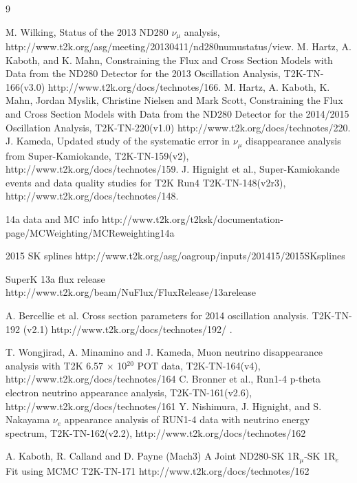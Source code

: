 \begin{thebibliography}{9}
%
%

  M. Wilking,
  Status of the 2013 ND280 $\nu_{\mu}$ analysis,\\
  http://www.t2k.org/asg/meeting/20130411/nd280numustatus/view.
  M. Hartz, A. Kaboth, and K. Mahn,
  Constraining the Flux and Cross Section Models with Data from the
  ND280 Detector for the 2013 Oscillation Analysis,
  T2K-TN-166(v3.0)
  http://www.t2k.org/docs/technotes/166.
  M. Hartz, A. Kaboth, K. Mahn, Jordan Myslik, Christine Nielsen and Mark Scott,
  Constraining the Flux and Cross Section Models with Data from the
  ND280 Detector for the 2014/2015 Oscillation Analysis,
  T2K-TN-220(v1.0)
  http://www.t2k.org/docs/technotes/220.
   J. Kameda,
   Updated study of the systematic error in $\nu_{\mu}$ disappearance analysis from Super-Kamiokande,
   T2K-TN-159(v2),
   http://www.t2k.org/docs/technotes/159.
   J. Hignight et al.,
   Super-Kamiokande events and data quality studies for T2K Run4
   T2K-TN-148(v2r3),
   http://www.t2k.org/docs/technotes/148.

%
%

   14a data and MC info
   http://www.t2k.org/t2ksk/documentation-page/MCWeighting/MCReweighting14a

   2015 SK splines
   http://www.t2k.org/asg/oagroup/inputs/201415/2015SKsplines

   SuperK 13a flux release
   http://www.t2k.org/beam/NuFlux/FluxRelease/13arelease
   
   A. Bercellie et al.
   Cross section parameters for 2014 oscillation analysis.
   T2K-TN-192 (v2.1)
   http://www.t2k.org/docs/technotes/192/ .
%
%
%


  T. Wongjirad, A. Minamino and J. Kameda,
  Muon neutrino disappearance analysis with T2K 6.57 $\times$ 10$^{20}$ POT data,
  T2K-TN-164(v4),
  http://www.t2k.org/docs/technotes/164
  C. Bronner et al.,
  Run1-4 p-theta electron neutrino appearance analysis,
  T2K-TN-161(v2.6),
  http://www.t2k.org/docs/technotes/161
  Y. Nishimura, J. Hignight, and S. Nakayama
  $\nu_e$ appearance analysis of RUN1-4 data with neutrino energy spectrum,
  T2K-TN-162(v2.2),
  http://www.t2k.org/docs/technotes/162
  
  A. Kaboth, R. Calland and D. Payne (Mach3)
  A Joint ND280-SK 1$\text{R}_{\mu}$-SK 1$\text{R}_e$ Fit using MCMC 
  T2K-TN-171
  http://www.t2k.org/docs/technotes/162


\end{thebibliography}
